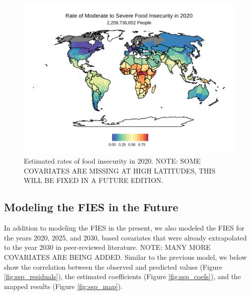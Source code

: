 \documentclass{article}
\begin{document}
\begin{figure}[H]
	\centering
	\includegraphics[width=\linewidth]{../figures/Pred2020_LASSO.png}
	\caption{Estimated rates of food insecurity in 2020. NOTE: SOME COVARIATES ARE MISSING AT HIGH LATITUDES, THIS WILL BE FIXED IN A FUTURE EDITION.}
	\label{fig:lasso_map}
\end{figure}


\subsection{Modeling the FIES in the Future}
In addition to modeling the FIES in the present, we also modeled the FIES for the years 2020, 2025, and 2030, based covariates that were already extrapolated to the year 2030 in peer-reviewed literature.  NOTE: MANY MORE COVARIATES ARE BEING ADDED.  Similar to the previous model, we below show the correlation between the observed and predicted values (Figure \ref{fig:ssp_residuals}), the estimated coefficients (Figure \ref{fig:ssp_coefs}), and the mapped results (Figure \ref{fig:ssp_map}).
\end{document}

